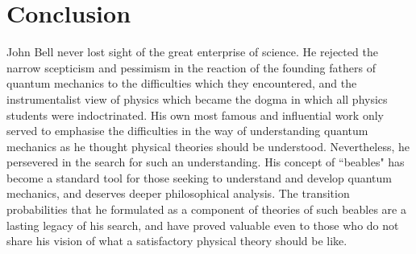 \documentclass[12pt,a4paper,reqno]{article}
\renewcommand{\(}{\left(}
\renewcommand{\)}{\right)}
\renewcommand{\.}{\centerdot}
\newcommand{\1}{\mathbf{1}}
\newcommand{\<}{\langle}
\renewcommand{\>}{\rangle}
\theoremstyle{definition}
\theoremstyle{remark}
\numberwithin{equation}{section}
\begin{document}
\section{Conclusion}

John Bell never lost sight of the great enterprise of science. He rejected the narrow scepticism and pessimism in the reaction of the founding fathers of quantum mechanics to the difficulties which they encountered, and the instrumentalist view of physics which became the dogma in which all physics students were indoctrinated. His own most famous and influential work only served to emphasise the difficulties in the way of understanding quantum mechanics as he thought physical theories should be understood. Nevertheless, he persevered in the search for such an understanding. His concept of ``beables" has become a standard tool for those seeking to understand and develop quantum mechanics, and deserves deeper philosophical analysis. The transition probabilities that he formulated as a component of theories of such beables are a lasting legacy of his search, and have proved valuable even to those who do not share his vision of what a satisfactory physical theory should be like. 


%
%
\end{document}

